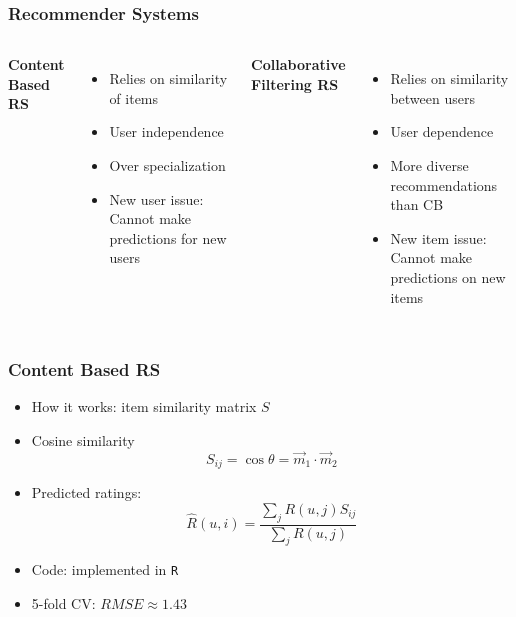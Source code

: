 \documentclass[table]{beamer}
\begin{document}
\begin{frame}
\frametitle{Recommender Systems}
  \vspace{1cm}
  \begin{columns}[t]
    \textbf{Content Based RS}
    \begin{itemize}
      \item Relies on similarity of items
        \bigskip
      \item User independence
      \item Over specialization
        \bigskip
      \item New user issue: Cannot make predictions for new users
    \end{itemize}
    \textbf{Collaborative Filtering RS}
    \begin{itemize}
      \item Relies on similarity between users
      \item User dependence
      \item More diverse recommendations than CB
      \item New item issue: Cannot make predictions on new items
    \end{itemize}
  \end{columns}
\end{frame}

\begin{frame}
\frametitle{Content Based RS}
  \begin{itemize}
    \item How it works: item similarity matrix $S$
    \item Cosine similarity 
      $$S_{ij} = \cos{\theta} = \vec{m}_1 \cdot \vec{m}_2$$
    \item Predicted ratings: 
      $$\hat{R}(u, i) = \frac{\sum_{j} R(u, j) S_{ij}}{\sum_j R(u,j)}$$
    \item Code: implemented in \texttt{R}
    \item 5-fold CV: $RMSE \approx 1.43$
  \end{itemize}
\end{frame}
\end{document}
